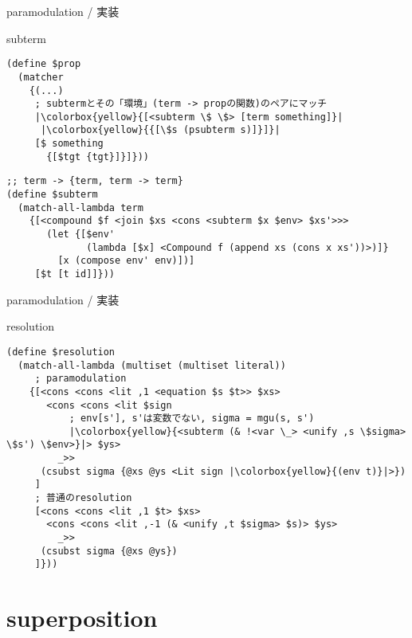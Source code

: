 \documentclass[dvipdfmx,11pt,notheorems]{beamer}
\theoremstyle{definition}
\begin{document}
\begin{frame}[fragile]{paramodulation / 実装}
  \begin{block}{subterm}
    \begin{verbatim}
(define $prop
  (matcher
    {(...)
     ; subtermとその「環境」(term -> propの関数)のペアにマッチ
     |\colorbox{yellow}{[<subterm \$ \$> [term something]}|
      |\colorbox{yellow}{{[\$s (psubterm s)]}]}|
     [$ something
       {[$tgt {tgt}]}]}))
    \end{verbatim}
  \end{block}

  \begin{block}{}
    \begin{verbatim}
;; term -> {term, term -> term}
(define $subterm
  (match-all-lambda term
    {[<compound $f <join $xs <cons <subterm $x $env> $xs'>>>
       (let {[$env'
              (lambda [$x] <Compound f (append xs (cons x xs'))>)]}
         [x (compose env' env)])]
     [$t [t id]]}))
    \end{verbatim}
  \end{block}
\end{frame}

\begin{frame}[fragile]{paramodulation / 実装}
  \begin{block}{resolution}
    \begin{verbatim}
(define $resolution
  (match-all-lambda (multiset (multiset literal))
     ; paramodulation
    {[<cons <cons <lit ,1 <equation $s $t>> $xs>
       <cons <cons <lit $sign
           ; env[s'], s'は変数でない, sigma = mgu(s, s')
           |\colorbox{yellow}{<subterm (& !<var \_> <unify ,s \$sigma> \$s') \$env>}|> $ys>
         _>>
      (csubst sigma {@xs @ys <Lit sign |\colorbox{yellow}{(env t)}|>})
     ]
     ; 普通のresolution
     [<cons <cons <lit ,1 $t> $xs>
       <cons <cons <lit ,-1 (& <unify ,t $sigma> $s)> $ys>
         _>>
      (csubst sigma {@xs @ys})
     ]}))
    \end{verbatim}
  \end{block}
\end{frame}

\section{superposition}
\end{document}
